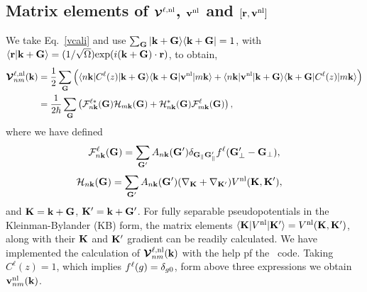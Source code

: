 \documentclass[floatfix,prb,aps,superscriptaddress,11pt,preprint,letterpaper]{revtex4}
\begin{document}
\subsection{Matrix elements of 
\texorpdfstring{$\boldsymbol{\mathcal{\cal V}}^{\ell,\mathrm{nl}}$}{Vnonlocal},
\texorpdfstring{$\mathbf{v}^{\mathrm{nl}}$}{Vnonlocal}
and $[\mathbf{r},\mathbf{v}^{\mathrm{nl}}]$}\label{vesnl}

We take Eq.~\eqref{vcali}
and use
$\sum_{\mathbf{G}}| \mathbf{k}+\mathbf{G} \rangle\langle \mathbf{k}+\mathbf{G} |=1$, 
with
$\langle {\mathbf{r}} | {\mathbf{k}+\mathbf{G}} \rangle=(1/\sqrt{\Omega})
\mathrm{exp}(i(\mathbf{k}+\mathbf{G})\cdot\mathbf{r})$,
to obtain,\cite{mottaCMS10}
\begin{align}\label{vnl.5}
\boldsymbol{\mathcal{\cal V}}^{\ell,\mathrm{nl}}_{nm}(\mathbf{k})&=\frac{1}{2}
\sum_{\mathbf{G}}
\Big(
\langle n\mathbf{k} | C^\ell(z) 
| \mathbf{k}+\mathbf{G} \rangle\langle \mathbf{k}+\mathbf{G} |
\mathbf{v}^{\mathrm{nl}} | m\mathbf{k} \rangle
+
\langle n\mathbf{k} |
\mathbf{v}^{\mathrm{nl}}  
| \mathbf{k}+\mathbf{G} \rangle\langle \mathbf{k}+\mathbf{G} |
C^\ell(z) | m\mathbf{k} \rangle
\Big)
\nonumber\\
&=\frac{1}{2 \hbar}
\sum_{\mathbf{G}}
\left(
{\mathbf{\cal F}}^{\ell*}_{n\mathbf{k}}(\mathbf{G}) 
{\mathbf{\cal H}}_{m\mathbf{k}}(\mathbf{G}) 
+
{\mathbf{\cal H}}^*_{n\mathbf{k}}(\mathbf{G}) 
{\mathbf{\cal F}}^\ell_{m\mathbf{k}}(\mathbf{G}) 
\right) 
,
\end{align}  
where 
we have defined  
\begin{align}\label{vnl.10}
{\mathbf{\cal F}}^\ell_{n\mathbf{k}}(\mathbf{G}) 
=
\sum_{\mathbf{G}'} 
A_{n\mathbf{k}}(\mathbf{G}') 
\delta_{\mathbf{G}_\parallel \mathbf{G}'_\parallel}f^\ell(\mathbf{G}'_\perp-\mathbf{G}_\perp) 
,
\end{align} 
\begin{align}\label{vnl.11}
{\mathbf{\cal H}}_{n\mathbf{k}}(\mathbf{G})&=
\sum_{\mathbf{G}'} 
A_{n\mathbf{k}}(\mathbf{G}') 
(\nabla_{\mathbf{K}}+\nabla_{\mathbf{K}'})  
V^{\mathrm{nl}}(\mathbf{K},\mathbf{K}') 
,
\end{align}
and $\mathbf{K}=\mathbf{k}+\mathbf{G}$, $\mathbf{K}'=\mathbf{k}+\mathbf{G}'$.
For fully  separable pseudopotentials in the   
Kleinman-Bylander (KB) form,\cite{mottaCMS10,kleinman_efficacious_1982,adolphPRB96}  
the  
matrix elements 
 $\langle \mathbf{K} |  
V^{\mathrm{nl}}  
| \mathbf{K}' \rangle
=V^{\mathrm{nl}}(\mathbf{K},\mathbf{K}')  
$, 
along with their $\mathbf{K}$ and $\mathbf{K}'$ gradient 
can be readily calculated.\cite{mottaCMS10,adolphPRB96,gordienkoRPJ04,fuchsCPC99} 
We have 
implemented 
the calculation of $\boldsymbol{\mathcal{\cal V}}^{\ell,\mathrm{nl}}_{nm}(\mathbf{k})$ with the help pf the  \depe~code.\cite{francesco}
Taking $C^\ell(z)=1$, which implies $f^\ell(g)=\delta_{g0}$, form above three expressions we obtain 
$\mathbf{v}^{\mathrm{nl}}_{nm}(\mathbf{k})$.
\end{document}
